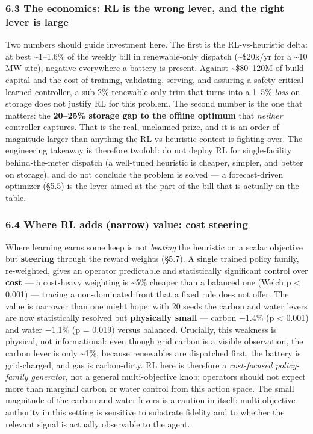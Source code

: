\documentclass[
  11pt,
]{article}
\begin{document}
\subsubsection{6.3 The economics: RL is the wrong lever, and the right
lever is
large}\label{the-economics-rl-is-the-wrong-lever-and-the-right-lever-is-large}

Two numbers should guide investment here. The first is the
RL-vs-heuristic delta: at best \textasciitilde1--1.6\% of the weekly
bill in renewable-only dispatch (\textasciitilde\$20k/yr for a
\textasciitilde10 MW site), negative everywhere a battery is present.
Against \textasciitilde\$80--120M of build capital and the cost of
training, validating, serving, and assuring a safety-critical learned
controller, a sub-2\% renewable-only trim that turns into a 1--5\%
\emph{loss} on storage does not justify RL for this problem. The second
number is the one that matters: the \textbf{20--25\% storage gap to the
offline optimum} that \emph{neither} controller captures. That is the
real, unclaimed prize, and it is an order of magnitude larger than
anything the RL-vs-heuristic contest is fighting over. The engineering
takeaway is therefore twofold: do not deploy RL for single-facility
behind-the-meter dispatch (a well-tuned heuristic is cheaper, simpler,
and better on storage), and do not conclude the problem is solved --- a
forecast-driven optimizer (§5.5) is the lever aimed at the part of the
bill that is actually on the table.

\subsubsection{6.4 Where RL adds (narrow) value: cost
steering}\label{where-rl-adds-narrow-value-cost-steering}

Where learning earns some keep is not \emph{beating} the heuristic on a
scalar objective but \textbf{steering} through the reward weights
(§5.7). A single trained policy family, re-weighted, gives an operator
predictable and statistically significant control over \textbf{cost} ---
a cost-heavy weighting is \textasciitilde5\% cheaper than a balanced one
(Welch p \textless{} 0.001) --- tracing a non-dominated front that a
fixed rule does not offer. The value is narrower than one might hope:
with 20 seeds the carbon and water levers are now statistically resolved
but \textbf{physically small} --- carbon −1.4\% (p \textless{} 0.001)
and water −1.1\% (p = 0.019) versus balanced. Crucially, this weakness
is physical, not informational: even though grid carbon is a visible
observation, the carbon lever is only \textasciitilde1\%, because
renewables are dispatched first, the battery is grid-charged, and gas is
carbon-dirty. RL here is therefore a \emph{cost-focused policy-family
generator}, not a general multi-objective knob; operators should not
expect more than marginal carbon or water control from this action
space. The small magnitude of the carbon and water levers is a caution
in itself: multi-objective authority in this setting is sensitive to
substrate fidelity and to whether the relevant signal is actually
observable to the agent.
\end{document}
